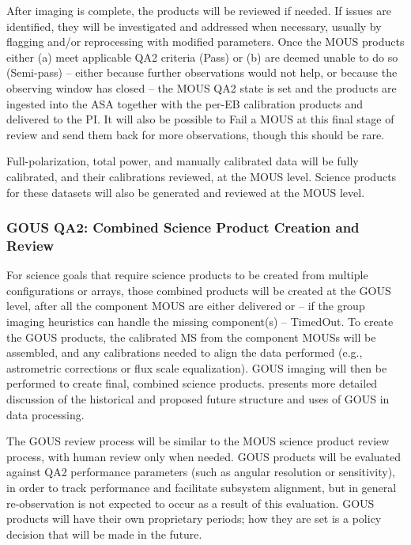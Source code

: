 After imaging is complete, the products will be reviewed if needed. If issues are identified, they will be investigated and addressed when necessary, usually by flagging and/or reprocessing with modified parameters. Once the MOUS products either (a) meet applicable QA2 criteria (Pass) or (b) are deemed unable to do so (Semi-pass) -- either because further observations would not help, or because the observing window has closed -- the MOUS QA2 state is set and the products are ingested into the \ac{ASA} together with the per-EB calibration products and delivered to the PI. It will also be possible to Fail a MOUS at this final stage of review  and send them back for more observations, though this should be rare.


Full-polarization, total power, and manually calibrated data will be fully calibrated, and their calibrations reviewed, at the MOUS level. Science products for these datasets will also be generated and  reviewed at the MOUS level.

\subsubsection{GOUS QA2: Combined Science Product Creation and Review}
\label{sec:qa2gous}

For science goals that require science products to be created from multiple configurations or arrays, those combined products will be created at the \ac{GOUS} level, after all the component MOUS are either delivered or -- if the group imaging heuristics can handle the missing component(s) -- TimedOut. To create the GOUS products, the calibrated MS from the component MOUSs will be assembled, and any calibrations needed to align the data performed (e.g., astrometric corrections or flux scale equalization). GOUS imaging will then be performed to create final, combined science products. \cite{groupTsi} presents more detailed discussion of the historical and proposed future structure and uses of GOUS in data processing.

The GOUS review process will be similar to the MOUS science 
product review process, with human review only when needed. 
GOUS products will be evaluated against QA2 performance 
parameters (such as angular resolution or sensitivity), in order to track performance and facilitate 
subsystem alignment, but in general re-observation is not 
expected to occur as a result of this evaluation. GOUS 
products will have their own proprietary periods; how they 
are set  is a policy decision that will be made in the future. 

